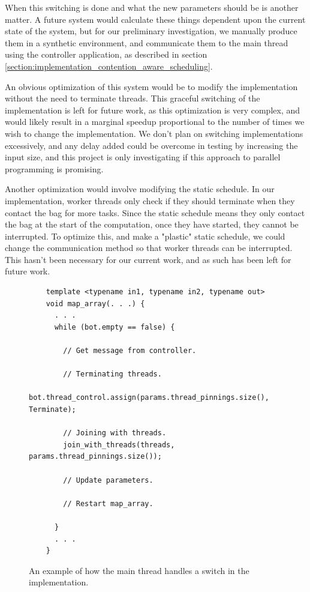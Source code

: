 When this switching is done and what the new parameters should be is another matter. A future system would calculate these things dependent upon the current state of the system, but for our preliminary investigation, we manually produce them in a synthetic environment, and communicate them to the main thread using the controller application, as described in section \ref{section:implementation_contention_aware_scheduling}.

An obvious optimization of this system would be to modify the implementation without the need to terminate threads. This graceful switching of the implementation is left for future work, as this optimization is very complex, and would likely result in a marginal speedup proportional to the number of times we wish to change the implementation. We don't plan on switching implementations excessively, and any delay added could be overcome in testing by increasing the input size, and this project is only investigating if this approach to parallel programming is promising.

Another optimization would involve modifying the static schedule. In our implementation, worker threads only check if they should terminate when they contact the bag for more tasks. Since the static schedule means they only contact the bag at the start of the computation, once they have started, they cannot be interrupted. To optimize this, and make a "plastic" static schedule, we could change the communication method so that worker threads can be interrupted. This hasn't been necessary for our current work, and as such has been left for future work.



\begin{figure}
	\begin{lstlisting}
	template <typename in1, typename in2, typename out>
	void map_array(. . .) {
	  . . .
	  while (bot.empty == false) {
  
	    // Get message from controller.
  
        // Terminating threads.
        bot.thread_control.assign(params.thread_pinnings.size(), Terminate);
  
        // Joining with threads.
        join_with_threads(threads, params.thread_pinnings.size());
  
        // Update parameters.
  
        // Restart map_array.
  	    
	  }
	  . . .
	}
	\end{lstlisting}

	\caption{An example of how the main thread handles a switch in the implementation.}
	\label{fig:implementation_main_thread_bot_comms}
\end{figure}



